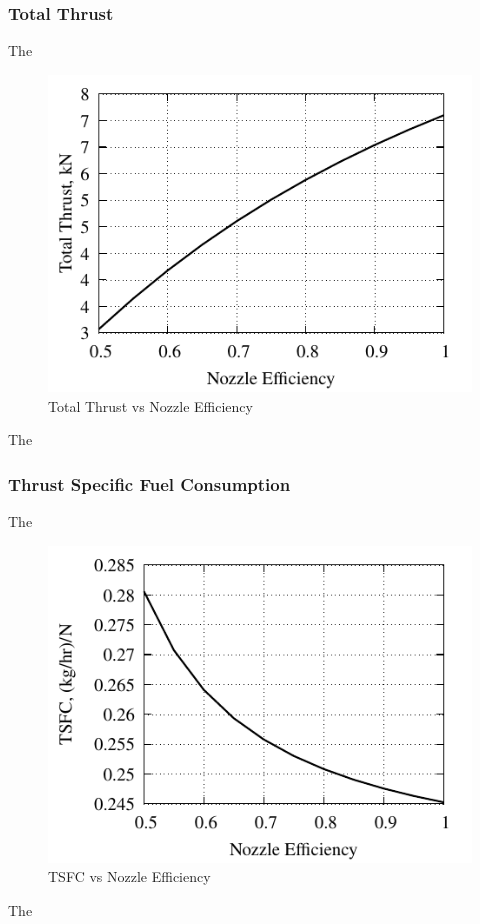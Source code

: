 \documentclass[conf]{new-aiaa} %
\begin{document}
\subsubsection{Total Thrust}
The

\begin{figure}[hbt!] %
    \centering
    \includegraphics[]{media/performance_parameter_files/part_g_T.pdf}
    \caption{\label{fig:partgt}Total Thrust vs Nozzle Efficiency}
\end{figure}
The

\subsubsection{Thrust Specific Fuel Consumption}
The

\begin{figure}[hbt!] %
    \centering
    \includegraphics[]{media/performance_parameter_files/part_g_TSFC.pdf}
    \caption{\label{fig:partgtsfc}TSFC vs Nozzle Efficiency}
\end{figure}
The
\end{document}
